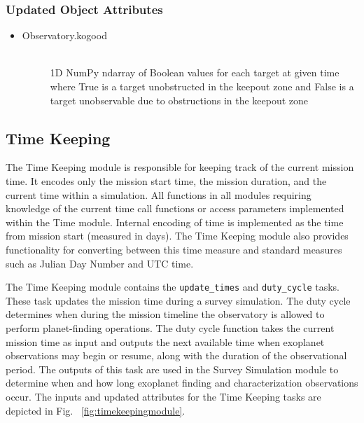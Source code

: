 \documentclass[cleanfoot]{asme2ej}
\begin{document}
\subsubsection*{Updated Object Attributes}
\begin{itemize}
    \item 
    \begin{description}
        \item[Observatory.kogood] \hfill \\
        1D NumPy ndarray of Boolean values for each target at given time where True is a target unobstructed in the keepout zone and False is a target unobservable due to obstructions in the keepout zone
    \end{description}
\end{itemize}


\subsection{Time Keeping} \label{sec:time}
The Time Keeping module is responsible for keeping track of the current mission time.  It encodes only the mission start time, the mission duration, and the current time within a simulation.  All functions in all modules requiring knowledge of the current time call functions or access parameters implemented within the Time module.  Internal encoding of time is implemented as the time from mission start (measured in days).  The Time Keeping module also provides functionality for converting between this time measure and standard measures such as Julian Day Number and UTC time.
  
The Time Keeping module contains the \verb+update_times+ and \verb+duty_cycle+ tasks.  These task updates the mission time during a survey simulation.  The duty cycle determines when during the mission timeline the observatory is allowed to perform planet-finding operations.  The duty cycle function takes the current mission time as input and outputs the next available time when exoplanet observations may begin or resume, along with the duration of the observational period. The outputs of this task are used in the Survey Simulation module to determine when and how long exoplanet finding and characterization observations occur.  The inputs and updated attributes for the Time Keeping tasks are depicted in Fig. ~\ref{fig:timekeepingmodule}.
\end{document}
